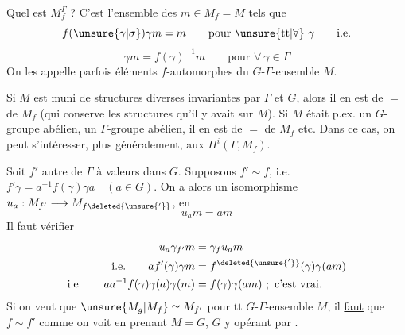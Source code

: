 Quel est  $M_f^\Gamma$ ? C'est l'ensemble des $m\in M_f=M$ tels que
\[
f(\unsure{\gamma|\sigma})\gamma m=m\qquad\text{pour }\unsure{\mathrm{tt}|\forall}\ \gamma\qquad\text{i.e.}
\]
\[
\boxed{\gamma m=f(\gamma)^{-1}m\qquad\text{pour }\forall\ \gamma\in\Gamma}
\]
On les appelle parfois éléments $f$-automorphes du $G$-$\Gamma$-ensemble $M$.

Si $M$ est muni  de structures diverses invariantes par $\Gamma$ et $G$, alors il en est de $=$ de $M_f$ (qui conserve les structures qu'il y avait sur $M$). Si $M$ était p.ex. un $G$-groupe abélien,  un $\Gamma$-groupe abélien, il en est de $=$ de $M_f$ etc. Dans ce cas, on peut s'intéresser, plus généralement, aux $H^i(\Gamma,M_f)$.

Soit $f'$  autre  de $\Gamma$ à valeurs dans $G$. Supposons $f'\sim f$, i.e. $f'\gamma=a^{-1}f(\gamma)\gamma a\quad(a\in G)$. On a alors un isomorphisme $u_a:M_{f'}\longrightarrow M_{f\deleted{\unsure{'}}}$, en 
\[
u_a m=a m
\]
Il faut vérifier
\[
\begin{aligned}
u_a\gamma_{f'}m&=\gamma_f u_a m\\
\text{i.e.}\qquad a f'(\gamma)\gamma m&=f^{\deleted{\unsure{'}}}(\gamma)\gamma(am)\\
\text{i.e.}\qquad aa^{-1}f(\gamma)\gamma(a)\gamma(m)&=f(\gamma)\gamma(am)\ ;\ \text{c'est vrai.}
\end{aligned}
\]
Si on veut que $\unsure{M_g|M_f}\simeq M_{f'}$ pour $\mathrm{tt}$ $G$-$\Gamma$-ensemble $M$, il \uline{faut} que $f\sim f'$ comme on voit en prenant $M=G$, $G$ y opérant par .
